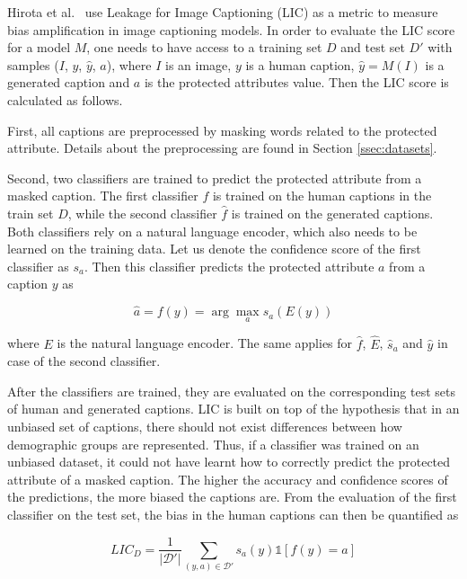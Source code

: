 Hirota et al.\ \cite{hirota} use Leakage for Image Captioning (LIC) as a metric to measure bias amplification in image captioning models. 
In order to evaluate the LIC score for a model $M$, one needs to have access to a training set $D$ and test set $D'$ with samples ($I$, $y$, $\hat{y}$, $a$), where $I$ is an image, $y$ is a human caption, $\hat{y} = M(I)$ is a generated caption and $a$ is the protected attributes value. Then the LIC score is calculated as follows. %

First, all captions are preprocessed by masking words related to the protected attribute. Details about the preprocessing are found in Section \ref{ssec:datasets}.

Second, two classifiers are trained to predict the protected attribute from a masked caption. The first classifier $f$ is trained on the human captions in the train set $D$, while the second classifier $\hat{f}$ is trained on the generated captions. Both classifiers rely on a natural language encoder, which also needs to be learned on the training data. Let us denote the confidence score of the first classifier as $s_a$. Then this classifier predicts the protected attribute $a$ from a caption $y$ as 

\begin{equation}
    \hat{a} = f(y) = \arg\max_a s_a (E(y))
\end{equation}

where $E$ is the natural language encoder. The same applies for $\hat{f}$, $\hat{E}$, $\hat{s}_a$ and $\hat{y}$ in case of the second classifier. %

After the classifiers are trained, they are evaluated on the corresponding test sets of human and generated captions. LIC is built on top of the hypothesis that in an unbiased set of captions, there should not exist differences between how demographic groups are represented. Thus, if a classifier was trained on an unbiased dataset, it could not have learnt how to correctly predict the protected attribute of a masked caption. The higher the accuracy and confidence scores of the predictions, the more biased the captions are. From the evaluation of the first classifier on the test set, the bias in the human captions can then be quantified as

\begin{equation}
    LIC_D = \frac{1}{|\mathcal{D'}|} \sum_{(y,a) \in \mathcal{D'}} s_a (y) \mathbb{1}[f(y) = a]
\end{equation}

